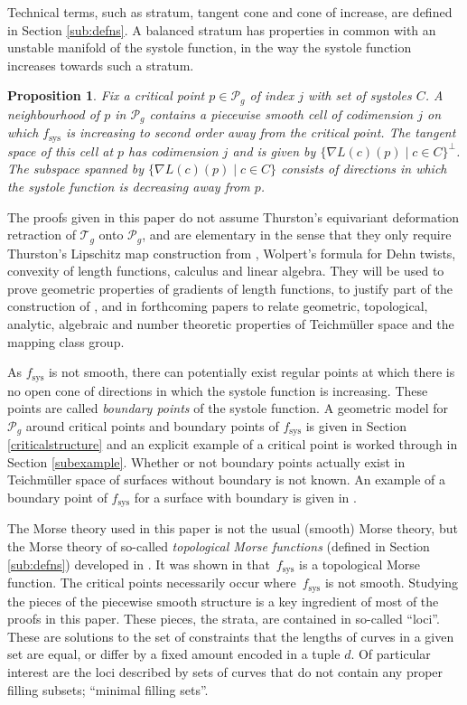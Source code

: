 \documentclass[pdftex]{sigma}
\numberwithin{equation}{section}
\newtheorem{Proposition}[Theorem]{Proposition}
\begin{document}
Technical terms, such as stratum, tangent cone and cone of increase, are defined in Section \ref{sub:defns}. A balanced stratum has properties in common with an unstable manifold of the systole function, in the way the systole function increases towards such a stratum.

\begin{Proposition}
\label{thm3}
Fix a critical point $p\in \mathcal{P}_{g}$ of index $j$ with set of systoles $C$. A neighbourhood of $p$ in $\mathcal{P}_{g}$ contains a piecewise smooth cell of codimension $j$ on which $f_{\mathrm{sys}}$ is increasing to second order away from the critical point. The tangent space of this cell at $p$ has codimension $j$ and is given by $\{\nabla L(c)(p) \mid c\in C\}^{\perp}$. The subspace spanned by $\{\nabla L(c)(p) \mid c\in C\}$ consists of directions in which the systole function is decreasing away from $p$.
\end{Proposition}

The proofs given in this paper do not assume Thurston's equivariant deformation retraction of $\mathcal{T}_{g}$ onto $\mathcal{P}_{g}$, and are elementary in the sense that they only require Thurston's Lipschitz map construction from \cite{Thurston}, Wolpert's formula for Dehn twists, convexity of length functions, calculus and linear algebra. They will be used to prove geometric properties of gradients of length functions, to justify part of the construction of \cite{Thurston}, and in forthcoming papers to relate geometric, topological, analytic, algebraic and number theoretic properties of Teichm\"uller space and the mapping class group.

As $f_{\mathrm{sys}}$ is not smooth, there can potentially exist regular points at which there is no open cone of directions in which the systole function is increasing. These points are called \textit{boundary points} of the systole function. A geometric model for $\mathcal{P}_{g}$ around critical points and boundary points of $f_{\mathrm{sys}}$ is given in Section \ref{criticalstructure} and an explicit example of a critical point is worked through in Section \ref{subexample}. Whether or not boundary points actually exist in Teichm\"uller space of surfaces without boundary is not known. An example of a boundary point of $f_{\mathrm{sys}}$ for a surface with boundary is given in \cite[p.~434, point~(ii)]{SchmutzMorse}.

The Morse theory used in this paper is not the usual (smooth) Morse theory, but the Morse theory of so-called \textit{topological Morse functions} (defined in Section \ref{sub:defns}) developed in \cite{Morse}. It was shown in \cite{Akrout} that~$f_{\mathrm{sys}}$ is a topological Morse function. The critical points necessarily occur where~$f_{\mathrm{sys}}$ is not smooth. Studying the pieces of the piecewise smooth structure is a key ingredient of most of the proofs in this paper. These pieces, the strata, are contained in so-called ``loci''. These are solutions to the set of constraints that the lengths of curves in a given set are equal, or differ by a fixed amount encoded in a tuple $d$. Of particular interest are the loci described by sets of curves that do not contain any proper filling subsets; ``minimal filling sets''.
\end{document}
